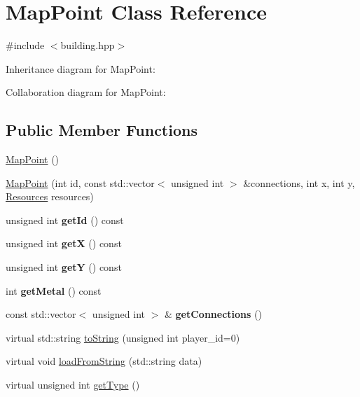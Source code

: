 \hypertarget{classMapPoint}{}\section{Map\+Point Class Reference}
\label{classMapPoint}


{\ttfamily \#include $<$building.\+hpp$>$}



Inheritance diagram for Map\+Point\+:


Collaboration diagram for Map\+Point\+:
\subsection*{Public Member Functions}
\begin{DoxyCompactItemize}
\item 
\hyperlink{classMapPoint_ab74cdf0388b2b7a08763e06006ddfeb9}{Map\+Point} ()
\item 
\hyperlink{classMapPoint_a2b7ec1372a03f899cbaa771d8acb9031}{Map\+Point} (int id, const std\+::vector$<$ unsigned int $>$ \&connections, int x, int y, \hyperlink{classResources}{Resources} resources)
\item 
unsigned int {\bfseries get\+Id} () const \hypertarget{classMapPoint_a07b1029f4d2d640a323bc01c95f1963a}{}\label{classMapPoint_a07b1029f4d2d640a323bc01c95f1963a}

\item 
unsigned int {\bfseries getX} () const \hypertarget{classMapPoint_a72e5351f3e9606dacb7c513b7d8c4196}{}\label{classMapPoint_a72e5351f3e9606dacb7c513b7d8c4196}

\item 
unsigned int {\bfseries getY} () const \hypertarget{classMapPoint_aad906af349564b21bdea9ab91a27fb6a}{}\label{classMapPoint_aad906af349564b21bdea9ab91a27fb6a}

\item 
int {\bfseries get\+Metal} () const \hypertarget{classMapPoint_ad17d07c7d1c6821a8ea4829202631fcb}{}\label{classMapPoint_ad17d07c7d1c6821a8ea4829202631fcb}

\item 
const std\+::vector$<$ unsigned int $>$ \& {\bfseries get\+Connections} ()\hypertarget{classMapPoint_ae22a25f9ab9c4c277ab036fd2c76d53d}{}\label{classMapPoint_ae22a25f9ab9c4c277ab036fd2c76d53d}

\item 
virtual std\+::string \hyperlink{classMapPoint_a45aa1bd9ce0a2d172c135f324f823973}{to\+String} (unsigned int player\+\_\+id=0)
\item 
virtual void \hyperlink{classMapPoint_add482d105e9b5089fb274dd1f32dfa9d}{load\+From\+String} (std\+::string data)
\item 
virtual unsigned int \hyperlink{classMapPoint_a5f869aa003f10b7480907f0d0089e887}{get\+Type} ()
\end{DoxyCompactItemize}
